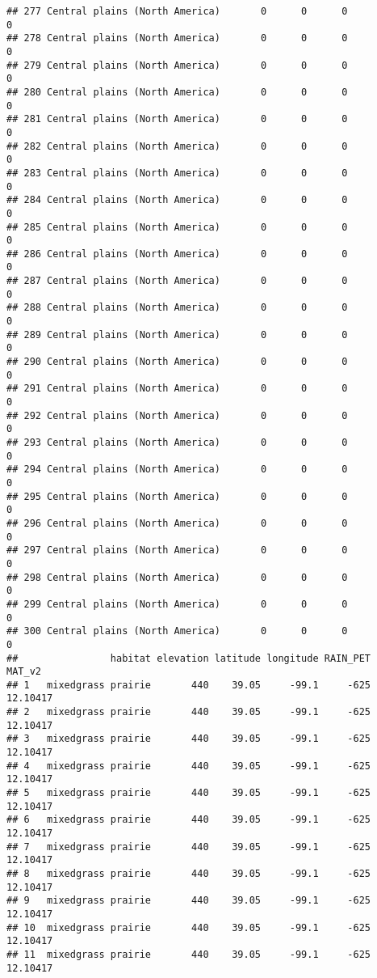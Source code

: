 \documentclass[]{article}
\begin{document}
\begin{verbatim}
## 277 Central plains (North America)       0      0      0             0
## 278 Central plains (North America)       0      0      0             0
## 279 Central plains (North America)       0      0      0             0
## 280 Central plains (North America)       0      0      0             0
## 281 Central plains (North America)       0      0      0             0
## 282 Central plains (North America)       0      0      0             0
## 283 Central plains (North America)       0      0      0             0
## 284 Central plains (North America)       0      0      0             0
## 285 Central plains (North America)       0      0      0             0
## 286 Central plains (North America)       0      0      0             0
## 287 Central plains (North America)       0      0      0             0
## 288 Central plains (North America)       0      0      0             0
## 289 Central plains (North America)       0      0      0             0
## 290 Central plains (North America)       0      0      0             0
## 291 Central plains (North America)       0      0      0             0
## 292 Central plains (North America)       0      0      0             0
## 293 Central plains (North America)       0      0      0             0
## 294 Central plains (North America)       0      0      0             0
## 295 Central plains (North America)       0      0      0             0
## 296 Central plains (North America)       0      0      0             0
## 297 Central plains (North America)       0      0      0             0
## 298 Central plains (North America)       0      0      0             0
## 299 Central plains (North America)       0      0      0             0
## 300 Central plains (North America)       0      0      0             0
##                habitat elevation latitude longitude RAIN_PET   MAT_v2
## 1   mixedgrass prairie       440    39.05     -99.1     -625 12.10417
## 2   mixedgrass prairie       440    39.05     -99.1     -625 12.10417
## 3   mixedgrass prairie       440    39.05     -99.1     -625 12.10417
## 4   mixedgrass prairie       440    39.05     -99.1     -625 12.10417
## 5   mixedgrass prairie       440    39.05     -99.1     -625 12.10417
## 6   mixedgrass prairie       440    39.05     -99.1     -625 12.10417
## 7   mixedgrass prairie       440    39.05     -99.1     -625 12.10417
## 8   mixedgrass prairie       440    39.05     -99.1     -625 12.10417
## 9   mixedgrass prairie       440    39.05     -99.1     -625 12.10417
## 10  mixedgrass prairie       440    39.05     -99.1     -625 12.10417
## 11  mixedgrass prairie       440    39.05     -99.1     -625 12.10417

\end{verbatim}
\end{document}
